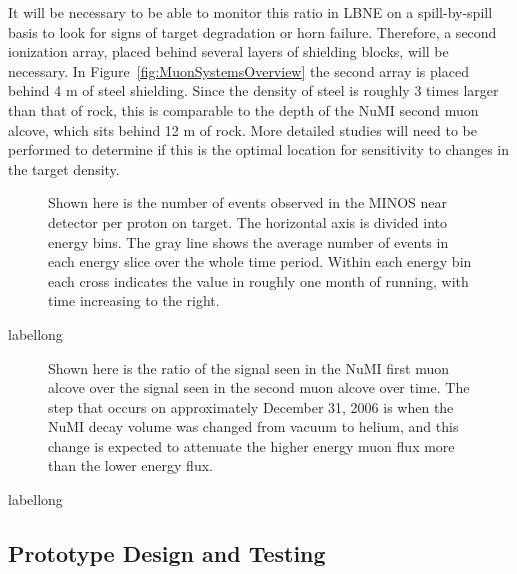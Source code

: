 It will be necessary to be able to monitor this ratio in LBNE on a spill-by-spill basis to look for signs of target degradation or horn failure.  
Therefore, a second ionization array, placed behind several layers of 
shielding blocks, will be necessary.  In Figure~\ref{fig:MuonSystemsOverview}
the second array is placed behind 4 m of steel shielding.  Since the density of steel is roughly 3 times larger than that of rock, this is comparable to the depth of the NuMI second muon alcove, which sits behind 12 m of rock.  More detailed studies will need to be performed to determine if this is the optimal location for sensitivity to changes in the target density.

\begin{figure}[htb]
\centering
\caption[NuMI target experience]
{Shown here is the number of events observed in the MINOS near detector per proton on target.  The horizontal axis is divided into energy bins.  The gray line shows the average number of events in each energy slice over the whole time period.  Within each energy bin each cross indicates the value in roughly one month of running, with time increasing to the right.}
\label{fig:numi_target_decay}
\end{figure}
\begin{cdrfigure}[short]{label}{long}
\end{cdrfigure}

\begin{figure}[htbp]
\centering
\caption[NuMI muon monitor ratios]
{Shown here is the ratio of the signal seen in 
the NuMI first muon alcove over the signal seen in the second muon alcove over time.  The step that occurs on approximately  December 31, 2006 is when the NuMI decay volume was changed from vacuum to helium, and this change is expected to attenuate the higher energy muon flux more than the lower energy flux.}
\label{fig:numi_mumon_ratio}
\end{figure}
\begin{cdrfigure}[short]{label}{long}
\end{cdrfigure}

\subsection{Prototype Design and Testing}

